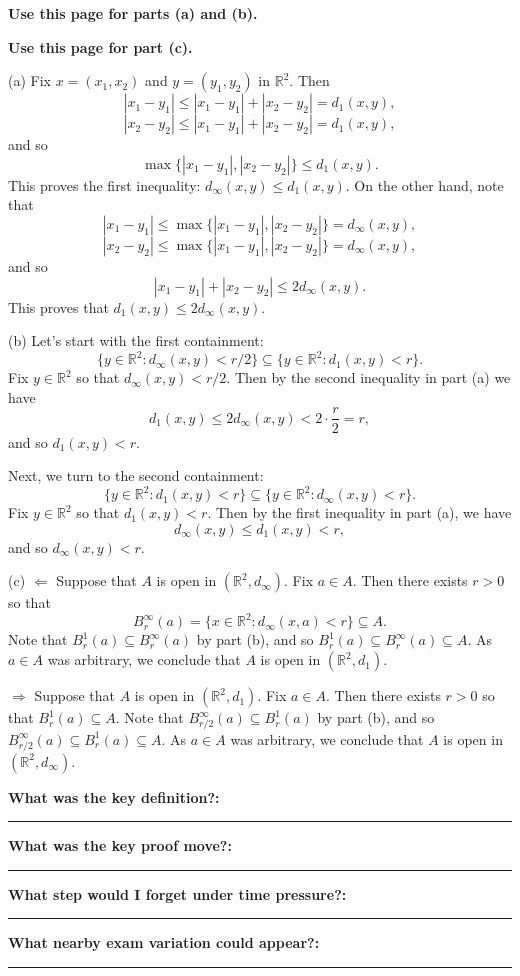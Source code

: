 \documentclass[12pt]{article}
\newcommand{\R}{\mathbb{R}}
\newcommand{\writespace}[1]{\vspace*{#1}}
\newcommand{\fillfieldbig}[2]{%
  \par\noindent\textbf{#1:}\par
  \writespace{#2}
  \noindent\rule{\linewidth}{0.35pt}\par\vspace{0.15in}%
}
\newcommand{\fullproofpage}[2]{%
  \begin{tcolorbox}[
    enhanced,
    colback=white,
    colframe=gray!60!black,
    fonttitle=\bfseries,
    title={Pass 5 -- Full Proof Attempt\hfill #1},
    height=8.45in
  ]
  \textbf{#2}

  \writespace{7.65in}
  \end{tcolorbox}
}
\newenvironment{solutionbox}[1]{%
  \begin{tcolorbox}[
    enhanced,
    breakable,
    colback=solgreen,
    colframe=green!45!black,
    fonttitle=\bfseries,
    title={#1}
  ]
}{%
  \end{tcolorbox}
}
\newcommand{\reflectionpage}[1]{%
  \begin{tcolorbox}[
    enhanced,
    colback=reflectcyan,
    colframe=cyan!55!black,
    fonttitle=\bfseries,
    title={Reflection \& Variation\hfill #1},
    height=8.45in
  ]
  \fillfieldbig{What was the key definition?}{1.15in}
  \fillfieldbig{What was the key proof move?}{1.15in}
  \fillfieldbig{What step would I forget under time pressure?}{1.15in}
  \fillfieldbig{What nearby exam variation could appear?}{1.35in}
  \end{tcolorbox}
}
\begin{document}
\newpage
\fullproofpage{Homework 8, Problem 2}{Use this page for parts (a) and (b).}

\newpage
\fullproofpage{Homework 8, Problem 2}{Use this page for part (c).}

\newpage
\begin{solutionbox}{Official Solution (Professor)}
(a) Fix \(x=(x_1,x_2)\) and \(y=(y_1,y_2)\) in \(\R^2\). Then
\[
  |x_1-y_1|\le |x_1-y_1|+|x_2-y_2|=d_1(x,y),
\]
\[
  |x_2-y_2|\le |x_1-y_1|+|x_2-y_2|=d_1(x,y),
\]
and so
\[
  \max\{|x_1-y_1|,|x_2-y_2|\}\le d_1(x,y).
\]
This proves the first inequality: \(d_\infty(x,y)\le d_1(x,y)\). On the other hand, note that
\[
  |x_1-y_1|\le \max\{|x_1-y_1|,|x_2-y_2|\}=d_\infty(x,y),
\]
\[
  |x_2-y_2|\le \max\{|x_1-y_1|,|x_2-y_2|\}=d_\infty(x,y),
\]
and so
\[
  |x_1-y_1|+|x_2-y_2|\le 2d_\infty(x,y).
\]
This proves that \(d_1(x,y)\le2d_\infty(x,y)\).

(b) Let's start with the first containment:
\[
  \{y\in\R^2:d_\infty(x,y)<r/2\}
  \subseteq
  \{y\in\R^2:d_1(x,y)<r\}.
\]
Fix \(y\in\R^2\) so that \(d_\infty(x,y)<r/2\). Then by the second inequality in part (a) we have
\[
  d_1(x,y)\le2d_\infty(x,y)<2\cdot\frac r2=r,
\]
and so \(d_1(x,y)<r\).

Next, we turn to the second containment:
\[
  \{y\in\R^2:d_1(x,y)<r\}
  \subseteq
  \{y\in\R^2:d_\infty(x,y)<r\}.
\]
Fix \(y\in\R^2\) so that \(d_1(x,y)<r\). Then by the first inequality in part (a), we have
\[
  d_\infty(x,y)\le d_1(x,y)<r,
\]
and so \(d_\infty(x,y)<r\).

(c) \(\Leftarrow\) Suppose that \(A\) is open in \((\R^2,d_\infty)\). Fix \(a\in A\). Then there exists \(r>0\) so that
\[
  B_r^\infty(a)=\{x\in\R^2:d_\infty(x,a)<r\}\subseteq A.
\]
Note that \(B_r^1(a)\subseteq B_r^\infty(a)\) by part (b), and so \(B_r^1(a)\subseteq B_r^\infty(a)\subseteq A\). As \(a\in A\) was arbitrary, we conclude that \(A\) is open in \((\R^2,d_1)\).

\(\Rightarrow\) Suppose that \(A\) is open in \((\R^2,d_1)\). Fix \(a\in A\). Then there exists \(r>0\) so that \(B_r^1(a)\subseteq A\). Note that \(B_{r/2}^\infty(a)\subseteq B_r^1(a)\) by part (b), and so \(B_{r/2}^\infty(a)\subseteq B_r^1(a)\subseteq A\). As \(a\in A\) was arbitrary, we conclude that \(A\) is open in \((\R^2,d_\infty)\).
\end{solutionbox}

\newpage
\reflectionpage{Homework 8, Problem 2}

\newpage
\end{document}
